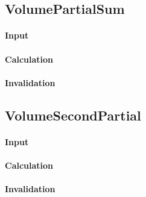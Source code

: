 \bigskip

\subsection{VolumePartialSum}

\paragraph{Input}

\paragraph{Calculation}

\paragraph{Invalidation}

\bigskip

\subsection{VolumeSecondPartial}

\paragraph{Input}

\paragraph{Calculation}

\paragraph{Invalidation}

\bigskip
